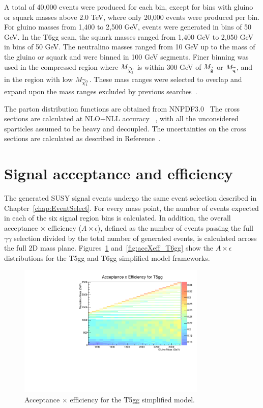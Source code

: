 A total of 40,000 events were produced for
each bin, except for bins with gluino or squark masses above 2.0 TeV, where only
20,000 events were produced per bin.
For gluino masses from 1,400 to 2,500 GeV, events were generated
in bins of 50 GeV.  In the T6gg scan, the squark masses ranged from
1,400 GeV to 2,050 GeV in bins of 50 GeV.
The neutralino masses ranged from 10 GeV up to the mass
of the gluino or squark and were binned in
100 GeV segments. Finer binning was used in the compressed region where
$M_{\widetilde{\chi}^{0}_{1}}$ is within 300 GeV of $M_{\widetilde{\mathrm{g}}}$ or $M_{\widetilde{\mathrm{q}}}$,
and in the region with low $M_{\widetilde{\chi}^{0}_{1}}$.
These mass ranges were selected to overlap and
expand upon the mass ranges excluded by previous
searches~\cite{ATLAS:2016aa,CMS:2016_anal}.

The parton distribution
functions are obtained from NNPDF3.0~\cite{Ball:2014uwa}
The cross sections are calculated at NLO+NLL accuracy
~\cite{Kulesza:2009kq, Beenakker:2009ha},
with all the unconsidered sparticles assumed to be heavy and decoupled.
The uncertainties on the cross sections are calculated as
described in Reference~\cite{Borschensky:2014cia}.



\section{Signal acceptance and efficiency}
The generated SUSY signal events undergo the same event selection described in Chapter~\ref{chap:EventSelect}. 
For every mass point, the number of events expected in each of the six signal region bins is calculated. 
In addition, the overall acceptance $\times$ efficiency ($A \times \epsilon$), defined as the number of events
passing the full $\gamma\gamma$ selection divided by the total number of generated events, is calculated across the 
full 2D mass plane. Figures~\ref{fig:accXeff_T5gg} and~\ref{fig:accXeff_T6gg} show the $A \times \epsilon$ distributions for the T5gg and T6gg simplified model 
frameworks.

\begin{figure}[h]
\begin{center}
\includegraphics[width=0.8\textwidth]{Figures/Results/accXeff_T5gg.pdf}
\end{center}
    \caption{Acceptance $\times$ efficiency for the T5gg simplified model.}
    \label{fig:accXeff_T5gg}
\end{figure}

